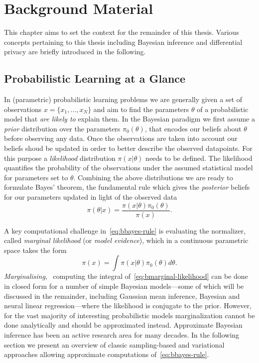 \chapter{Background Material}
\label{chap:chap2}

This chapter aims to set the context for the remainder of this thesis. Various concepts pertaining to this thesis including Bayesian inference and differential privacy are briefly introduced in the following.

\section{Probabilistic Learning at  a Glance}
\label{sec:b-bayesian-inference}

In (parametric) probabilistic learning problems we are generally given a set of observations $x = \{x_1,...,x_N\}$ and aim to find the parameters $\theta$ of a probabilistic model that \emph{are likely to} explain them. In the Bayesian paradigm we first assume a \emph{prior} distribution over the parameters $\pi_0(\theta)$, that encodes our beliefs about $\theta$ before observing any data. Once the observations are taken into account our beliefs shoud be updated in order to better describe the observed datapoints. For this purpose a \emph{likelihood} distribution $\pi(x|\theta)$ needs to be defined. The likelihood quantifies the probability of the observations under the assumed statistical model for parameters set to $\theta$. Combining the above distributions we are ready to formulate Bayes' theorem, the fundamental rule which gives the \emph{posterior} beliefs for our parameters updated in light of the observed data
\[
\pi(\theta|x) = \frac{\pi(x|\theta)\pi_0(\theta)}{\pi(x)}.
\label{eq:bbayes-rule}
\] 

A key computational challenge in~\cref{eq:bbayes-rule} is evaluating the normalizer, called \emph{marginal likelihood} (or \emph{model evidence}), which in a continuous parametric space takes the form
\[
\pi(x) = \int \pi(x|\theta) \pi_0(\theta) d\theta.
\label{eq:bmarginal-likelihood}
\]
\emph{Marginalising}, \ie~computing the integral of~\cref{eq:bmarginal-likelihood} can be done in closed form for a number of simple Bayesian models---some of which will be discussed in the remainder, including Gaussian mean inference, Bayesian and neural linear regression---where the likelihood is conjugate to the prior. However, for the vast majority of interesting probabilistic models marginalization cannot be done analytically and should be approximated instead. Approximate Bayesian inference has been an active research area for many decades. In the following section we present an overview of classic sampling-based and variational approaches allowing approximate computations of~\cref{eq:bbayes-rule}. 

